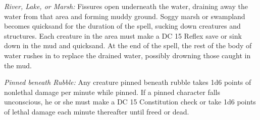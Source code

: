 \textit{River, Lake, or Marsh:} Fissures open underneath the water, draining away 
the water from that area and forming muddy ground. Soggy marsh or swampland becomes 
quicksand for the duration of the spell, sucking down creatures and structures. 
Each creature in the area must make a DC 15 Reflex save or sink down in the mud 
and quicksand. At the end of the spell, the rest of the body of water rushes in 
to replace the drained water, possibly drowning those caught in the mud.

\textit{Pinned beneath Rubble:} Any creature pinned beneath rubble takes 1d6 points 
of nonlethal damage per minute while pinned. If a pinned character falls unconscious, 
he or she must make a DC 15 Constitution check or take 1d6 points of lethal damage 
each minute thereafter until freed or dead.

